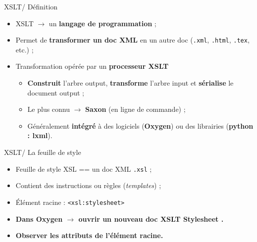 \documentclass{beamer}
\begin{document}
        \begin{frame}{XSLT/ Définition}
            \Large
            \begin{itemize}
                \item XSLT $\rightarrow$ un \textbf{langage de programmation} ;
                \bigskip
                \item Permet de \textbf{transformer un doc XML} en un autre doc  (\texttt{.xml}, \texttt{.html}, \texttt{.tex}, etc.) ;
                \bigskip
                \item Transformation opérée par un \textbf{processeur XSLT}
                \begin{itemize}
                    \item \textbf{Construit} l'arbre output, \textbf{transforme} l'arbre input et \textbf{sérialise} le document output ;
                    \item Le plus connu $\rightarrow$ \textbf{Saxon} (en ligne de commande) ;
                    \item Généralement \textbf{intégré} à des logiciels (\textbf{Oxygen}) ou des librairies (\textbf{python : lxml}).
                \end{itemize}
            \end{itemize}
        \end{frame}

        \begin{frame}{XSLT/ La feuille de style}
        \Large
            \begin{itemize}
                \item Feuille de style XSL == un doc XML \texttt{.xsl} ;
                \item Contient des instructions ou règles (\textit{templates})  ;
                \item Élément racine : \texttt{<xsl:stylesheet>}
            \end{itemize}
            \bigskip
            \bigskip
            \begin{itemize}
                \item \textbf{Dans Oxygen $\rightarrow$ ouvrir un nouveau doc \og XSLT Stylesheet \fg.}
                \item \textbf{Observer les attributs de l'élément racine.}
            \end{itemize}
        \end{frame}
\end{document}
